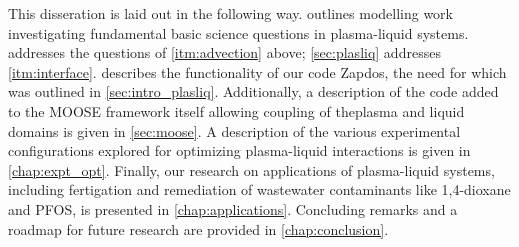 This disseration is laid out in the following way.  outlines modelling work investigating fundamental basic science questions in plasma-liquid systems.  addresses the questions of \cref{itm:advection} above; \cref{sec:plasliq} addresses \cref{itm:interface}.  describes the functionality of our code Zapdos, the need for which was outlined in \cref{sec:intro_plasliq}. Additionally, a description of the code added to the MOOSE framework itself allowing coupling of theplasma and liquid domains is given in \cref{sec:moose}. A description of the various experimental configurations explored for optimizing plasma-liquid interactions is given in \cref{chap:expt_opt}. Finally, our research on applications of plasma-liquid systems, including fertigation and remediation of wastewater contaminants like 1,4-dioxane and PFOS, is presented in \cref{chap:applications}. Concluding remarks and a roadmap for future research are provided in \cref{chap:conclusion}.
